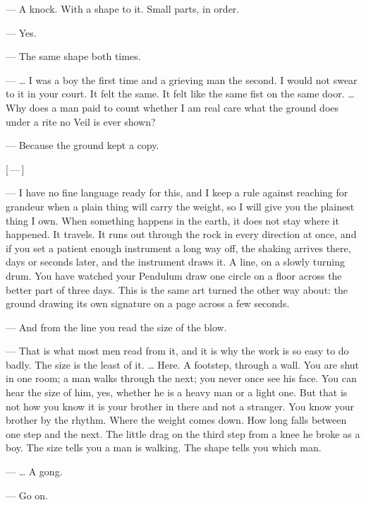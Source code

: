 \begin{room}
--- A knock. With a shape to it. Small parts, in order.

--- Yes.

--- The same shape both times.

--- \ldots{} I was a boy the first time and a grieving man the second. I would not swear to it in your court. It felt the same. It felt like the same fist on the same door. \ldots{} Why does a man paid to count whether I am real care what the ground does under a rite no Veil is ever shown?

--- Because the ground kept a copy.

\centerline{[\,---\,]}

--- I have no fine language ready for this, and I keep a rule against reaching for grandeur when a plain thing will carry the weight, so I will give you the plainest thing I own. When something happens in the earth, it does not stay where it happened. It travels. It runs out through the rock in every direction at once, and if you set a patient enough instrument a long way off, the shaking arrives there, days or seconds later, and the instrument draws it. A line, on a slowly turning drum. You have watched your Pendulum draw one circle on a floor across the better part of three days. This is the same art turned the other way about: the ground drawing its own signature on a page across a few seconds.

--- And from the line you read the size of the blow.

--- That is what most men read from it, and it is why the work is so easy to do badly. The size is the least of it. \ldots{} Here. A footstep, through a wall. You are shut in one room; a man walks through the next; you never once see his face. You can hear the size of him, yes, whether he is a heavy man or a light one. But that is not how you know it is your brother in there and not a stranger. You know your brother by the rhythm. Where the weight comes down. How long falls between one step and the next. The little drag on the third step from a knee he broke as a boy. The size tells you a man is walking. The shape tells you which man.

--- \ldots{} A gong.

--- Go on.


\end{room}
